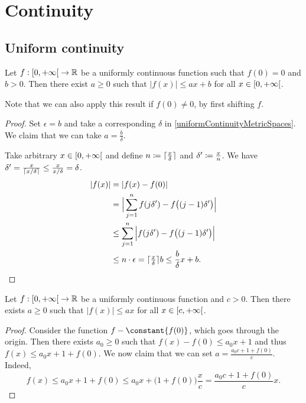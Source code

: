 \section{Continuity}
\subsection{Uniform continuity}
\begin{lemma} \label{affineBoundUniformlyContinuousFunction}
Let $f: \interval[co]{0,+\infty}\to \R$ be a uniformly continuous function such that $f(0) = 0$ and $b > 0$. Then there exist $a\geq 0$ such that $|f(x)| \leq ax+b$ for all $x\in \interval[co]{0,+\infty}$.
\end{lemma}
Note that we can also apply this result if $f(0) \neq 0$, by first shifting $f$.
\begin{proof}
Set $\epsilon = b$ and take a corresponding $\delta$ in \ref{uniformContinuityMetricSpaces}. We claim that we can take $a = \frac{b}{\delta}$.

Take arbitrary $x\in \interval[co]{0,+\infty}$ and define $n \coloneqq \lceil\frac{x}{\delta}\rceil$ and $\delta' \coloneqq \frac{x}{n}$. We have $\delta' = \frac{x}{\lceil x/\delta\rceil} \leq \frac{x}{x/\delta} = \delta$.
\begin{align*}
|f(x)| &= |f(x) - f(0)| \\
&= \Big|\sum_{j= 1}^{n} f(j\delta') - f\big((j-1)\delta'\big) \Big| \\
&\leq \sum_{j= 1}^{n} \Big|f(j\delta') - f\big((j-1)\delta'\big) \Big| \\
&\leq n\cdot \epsilon = \lceil\tfrac{x}{\delta}\rceil b \leq \frac{b}{\delta}x + b.
\end{align*}
\end{proof}
\begin{corollary} \label{linearBoundUniformlyContinuousFunction}
Let $f: \interval[co]{0,+\infty}\to \R$ be a uniformly continuous function and $c > 0$. Then there exists $a\geq 0$ such that $|f(x)| \leq ax$ for all $x\in \interval[co]{c,+\infty}$.
\end{corollary}
\begin{proof}
Consider the function $f- \constant{f(0)}$, which goes through the origin. Then there exists $a_0 \geq 0$ such that $f(x) - f(0) \leq a_0 x + 1$ and thus $f(x) \leq a_0 x + 1 + f(0)$. We now claim that we can set $a = \frac{a_0c + 1 + f(0)}{c}$. Indeed,
\[ f(x) \leq a_0 x + 1 + f(0) \leq  a_0 x + \big(1 + f(0)\big)\frac{x}{c} = \frac{a_0c + 1 + f(0)}{c}x. \]
\end{proof}

